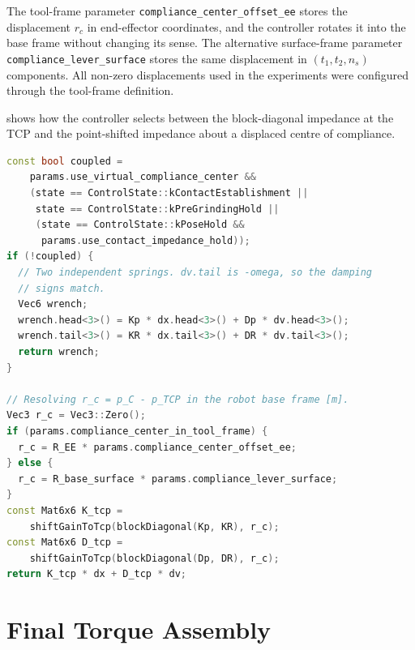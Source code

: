\begin{sloppypar}
The tool-frame parameter \texttt{compliance\_center\_offset\_ee} stores the
displacement \(r_c\) in end-effector coordinates, and the controller rotates it
into the base frame without changing its sense. The alternative surface-frame
parameter \texttt{compliance\_lever\_surface} stores the same displacement in
\mbox{\((t_1,t_2,n_s)\)} components. All non-zero  displacements
used in the experiments were configured through the tool-frame definition.
\end{sloppypar}

\mbox{} shows how the controller selects between
the block-diagonal impedance at the TCP and the point-shifted impedance about a
displaced centre of compliance.

\begin{lstlisting}[style=cppstyle, language=C++, caption={Selection of the decoupled or coupled spring wrench (abridged).}, label={lst:app_spring_wrench}]
const bool coupled =
    params.use_virtual_compliance_center &&
    (state == ControlState::kContactEstablishment ||
     state == ControlState::kPreGrindingHold ||
     (state == ControlState::kPoseHold &&
      params.use_contact_impedance_hold));
if (!coupled) {
  // Two independent springs. dv.tail is -omega, so the damping
  // signs match.
  Vec6 wrench;
  wrench.head<3>() = Kp * dx.head<3>() + Dp * dv.head<3>();
  wrench.tail<3>() = KR * dx.tail<3>() + DR * dv.tail<3>();
  return wrench;
}

// Resolving r_c = p_C - p_TCP in the robot base frame [m].
Vec3 r_c = Vec3::Zero();
if (params.compliance_center_in_tool_frame) {
  r_c = R_EE * params.compliance_center_offset_ee;
} else {
  r_c = R_base_surface * params.compliance_lever_surface;
}
const Mat6x6 K_tcp =
    shiftGainToTcp(blockDiagonal(Kp, KR), r_c);
const Mat6x6 D_tcp =
    shiftGainToTcp(blockDiagonal(Dp, DR), r_c);
return K_tcp * dx + D_tcp * dv;
\end{lstlisting}


\section{Final Torque Assembly}
\label{app:callback_core}


